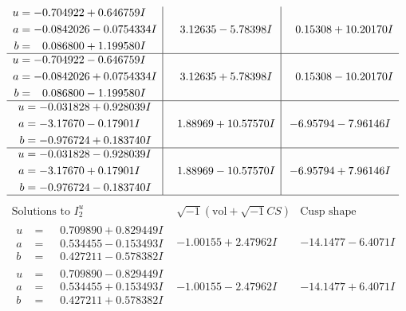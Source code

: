 \documentclass[1p]{elsarticle_modified}
\theoremstyle{definition}
\newcommand{\I}{\sqrt{-1}}
\begin{document}
$$\begin{array}{c|c|c}
\begin{aligned}
u &= -0.704922 + 0.646759 I \\
a &= -0.0842026 - 0.0754334 I \\
b &= \phantom{-}0.086800 + 1.199580 I\end{aligned}
 & \phantom{-}3.12635 - 5.78398 I & \phantom{-}0.15308 + 10.20170 I \\ \hline\begin{aligned}
u &= -0.704922 - 0.646759 I \\
a &= -0.0842026 + 0.0754334 I \\
b &= \phantom{-}0.086800 - 1.199580 I\end{aligned}
 & \phantom{-}3.12635 + 5.78398 I & \phantom{-}0.15308 - 10.20170 I \\ \hline\begin{aligned}
u &= -0.031828 + 0.928039 I \\
a &= -3.17670 - 0.17901 I \\
b &= -0.976724 + 0.183740 I\end{aligned}
 & \phantom{-}1.88969 + 10.57570 I & -6.95794 - 7.96146 I \\ \hline\begin{aligned}
u &= -0.031828 - 0.928039 I \\
a &= -3.17670 + 0.17901 I \\
b &= -0.976724 - 0.183740 I\end{aligned}
 & \phantom{-}1.88969 - 10.57570 I & -6.95794 + 7.96146 I\\
 \hline 
 \end{array}$$\newpage$$\begin{array}{c|c|c}  
\text{Solutions to }I^u_{2}& \I (\text{vol} + \sqrt{-1}CS) & \text{Cusp shape}\\
 \hline 
\begin{aligned}
u &= \phantom{-}0.709890 + 0.829449 I \\
a &= \phantom{-}0.534455 - 0.153493 I \\
b &= \phantom{-}0.427211 - 0.578382 I\end{aligned}
 & -1.00155 + 2.47962 I & -14.1477 - 6.4071 I \\ \hline\begin{aligned}
u &= \phantom{-}0.709890 - 0.829449 I \\
a &= \phantom{-}0.534455 + 0.153493 I \\
b &= \phantom{-}0.427211 + 0.578382 I\end{aligned}
 & -1.00155 - 2.47962 I & -14.1477 + 6.4071 I \\ \hline\begin{aligned}

\end{aligned}
\end{array}$$
\end{document}
